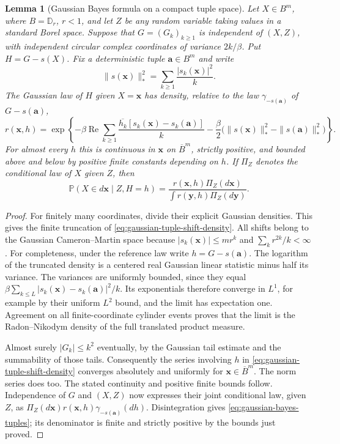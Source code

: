 \documentclass[11pt,a4paper]{article}
\numberwithin{equation}{section}
\newtheorem{lemma}[theorem]{Lemma}
\theoremstyle{definition}
\theoremstyle{remark}
\newcommand{\D}{\mathbb D}
\begin{document}
\begin{lemma}[Gaussian Bayes formula on a compact tuple space]
\label{lem:infinite-gaussian-bayes-tuples}
Let $X\in B^m$, where $B=\D_r$, $r<1$, and let $Z$ be any random
variable taking values in a standard Borel space. Suppose that
$G=(G_k)_{k\ge1}$ is independent of $(X,Z)$, with independent circular
complex coordinates of variance $2k/\beta$. Put $H=G-s(X)$.
Fix a deterministic tuple $\mathbf a\in B^m$ and write
\[
 \|s(\mathbf x)\|_*^2=\sum_{k\ge1}\frac{|s_k(\mathbf x)|^2}k.
\]
The Gaussian law of $H$ given $X=\mathbf x$ has density, relative to
the law $\gamma_{-s(\mathbf a)}$ of $G-s(\mathbf a)$,
\begin{equation}\label{eq:gaussian-tuple-shift-density}
 r(\mathbf x,h)=\exp\left\{
 -\beta\operatorname{Re}\sum_{k\ge1}
       \frac{\overline{h_k}[s_k(\mathbf x)-s_k(\mathbf a)]}k
 -\frac\beta2\bigl(\|s(\mathbf x)\|_*^2
                      -\|s(\mathbf a)\|_*^2\bigr)\right\}.
\end{equation}
For almost every $h$ this is continuous in $\mathbf x$ on
$\overline B^m$, strictly positive, and bounded above and below by
positive finite constants depending on $h$. If $\Pi_Z$ denotes the
conditional law of $X$ given $Z$, then
\begin{equation}\label{eq:gaussian-bayes-tuples}
 \mathbb P(X\in d\mathbf x\mid Z,H=h)
 =\frac{r(\mathbf x,h)\Pi_Z(d\mathbf x)}
        {\int r(\mathbf y,h)\Pi_Z(d\mathbf y)}.
\end{equation}
\end{lemma}

\begin{proof}
For finitely many coordinates, divide their explicit Gaussian densities.
This gives the finite truncation of
\eqref{eq:gaussian-tuple-shift-density}. All shifts belong to the
Gaussian Cameron--Martin space because
$|s_k(\mathbf x)|\le m r^k$ and
$\sum_k r^{2k}/k<\infty$.
For completeness, under the reference law write $h=G-s(\mathbf a)$.
The logarithm of the truncated density is a centered real Gaussian
linear statistic minus half its variance. The variances are uniformly
bounded, since they equal
$\beta\sum_{k\le L}|s_k(\mathbf x)-s_k(\mathbf a)|^2/k$.
Its exponentials therefore converge in $L^1$, for example by their
uniform $L^2$ bound, and the limit has expectation one. Agreement on
all finite-coordinate cylinder events proves that the limit is the
Radon--Nikodym density of the full translated product measure.

Almost surely $|G_k|\le k^2$ eventually, by the Gaussian tail estimate
and the summability of those tails. Consequently the series involving
$h$ in \eqref{eq:gaussian-tuple-shift-density} converges absolutely and
uniformly for $\mathbf x\in\overline B^m$. The norm series does too.
The stated continuity and positive finite bounds follow. Independence
of $G$ and $(X,Z)$ now expresses their joint conditional law, given
$Z$, as
$\Pi_Z(d\mathbf x)r(\mathbf x,h)\gamma_{-s(\mathbf a)}(dh)$.
Disintegration gives \eqref{eq:gaussian-bayes-tuples}; its denominator
is finite and strictly positive by the bounds just proved.
\end{proof}
\end{document}
